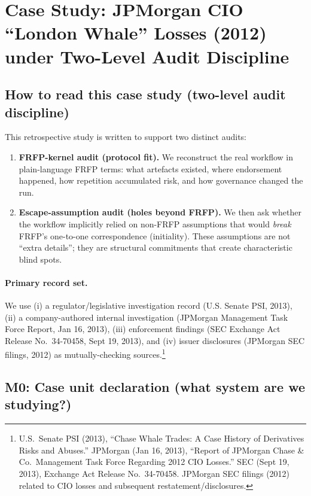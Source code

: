 \section{Case Study: JPMorgan CIO “London Whale” Losses (2012) under Two-Level Audit Discipline}
\label{sec:case-london-whale-two-level}

\subsection{How to read this case study (two-level audit discipline)}
This retrospective study is written to support two distinct audits:

\begin{enumerate}
\item \textbf{FRFP-kernel audit (protocol fit).} We reconstruct the real workflow in plain-language FRFP terms: what artefacts existed, where endorsement happened, how repetition accumulated risk, and how governance changed the run.
\item \textbf{Escape-assumption audit (holes beyond FRFP).} We then ask whether the workflow implicitly relied on non-FRFP assumptions that would \emph{break} FRFP’s one-to-one correspondence (initiality). These assumptions are not “extra details”; they are structural commitments that create characteristic blind spots.
\end{enumerate}

\paragraph{Primary record set.}
We use (i) a regulator/legislative investigation record (U.S. Senate PSI, 2013), (ii) a company-authored internal investigation (JPMorgan Management Task Force Report, Jan 16, 2013), (iii) enforcement findings (SEC Exchange Act Release No.\ 34-70458, Sept 19, 2013), and (iv) issuer disclosures (JPMorgan SEC filings, 2012) as mutually-checking sources.\footnote{U.S.\ Senate PSI (2013), ``Chase Whale Trades: A Case History of Derivatives Risks and Abuses.'' JPMorgan (Jan 16, 2013), ``Report of JPMorgan Chase \& Co.\ Management Task Force Regarding 2012 CIO Losses.'' SEC (Sept 19, 2013), Exchange Act Release No.\ 34-70458. JPMorgan SEC filings (2012) related to CIO losses and subsequent restatement/disclosures.}

\subsection{M0: Case unit declaration (what system are we studying?)}
\label{subsec:lw-m0}

